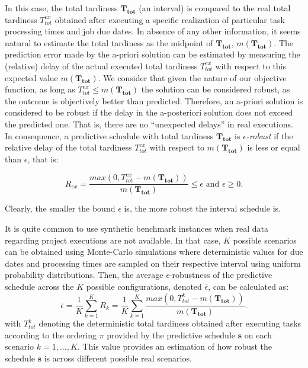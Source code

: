 \documentclass[12pt,halfline,a4paper]{ouparticle}
\begin{document}
In this case, the total tardiness $\mathbf{T_{tot}}$ (an interval) is compared to the real total tardiness $T_{tot}^{ex}$ obtained after executing a specific realization of particular task processing times and job due dates. In absence of any other information, it seems natural to estimate the total tardiness as the midpoint of $\mathbf{T_{tot}}$, $m(\mathbf{T_{tot}})$. The prediction error made by the a-priori solution can be estimated by measuring the (relative) delay of the actual executed total tardiness $T_{tot}^{ex}$ with respect to this expected value $m(\mathbf{T_{tot}})$. We consider that given the nature of our objective function, as long as $T_{tot}^{ex} \leq m(\mathbf{T_{tot}})$ the solution can be considered robust, as the outcome is objectively better than predicted. Therefore, an a-priori solution is considered to be robust if the delay in the a-posteriori solution does not exceed the predicted one. That is, there are no ``unexpected delays'' in real executions. In consequence, a predictive schedule with total tardiness $\mathbf{T_{tot}}$ is \emph{$\epsilon$-robust} if the relative delay of the total tardiness $T_{tot}^{ex}$ with respect to $m(\mathbf{T_{tot}})$ is less or equal than $\epsilon$, that is:


\begin{equation}\label{eqEpsilonRobustness2}
R_{ex}=\frac{max(0,T_{tot}^{ex}-m(\mathbf{T_{tot}}))}{m(\mathbf{T_{tot}})} \leq \epsilon \mbox{ and } \epsilon \geq 0.
\end{equation}

Clearly, the smaller the bound $\epsilon$ is, the more robust the interval schedule is.

It is quite common to use synthetic benchmark instances when real data regarding project executions are not available. In that case, $K$ possible scenarios can be obtained using Monte-Carlo simulations \cite{Palacios2014} where deterministic values for due dates and processing times are sampled on their respective interval using uniform probability distributions. Then, the average $\epsilon$-robustness of the predictive schedule across the $K$ possible configurations, denoted $\overline{\epsilon}$, can be calculated as:
\begin{equation}\label{eqMRE}
\overline{\epsilon}=\frac{1}{K}\sum_{k=1}^K R_k=\frac{1}{K}\sum_{k=1}^K\frac{max(0,T_{tot}^{k}-m(\mathbf{T_{tot}}))}{m(\mathbf{T_{tot}})}.
\end{equation}
with $T_{tot}^k$ denoting the deterministic total tardiness obtained after executing tasks according to the ordering $\pi$ provided by the predictive schedule $\boldsymbol{s}$ on each scenario $k=1,\dots,K$. This value provides an estimation of how robust the schedule $\boldsymbol{s}$ is across different possible real scenarios. 
\end{document}
